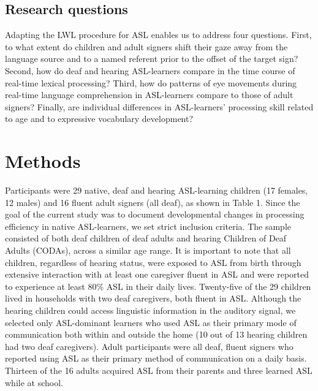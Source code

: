\documentclass[oneside]{report}
\begin{document}
\hypertarget{research-questions}{%
\subsection{Research questions}\label{research-questions}}

Adapting the LWL procedure for ASL enables us to address four questions.
First, to what extent do children and adult signers shift their gaze
away from the language source and to a named referent prior to the
offset of the target sign? Second, how do deaf and hearing ASL-learners
compare in the time course of real-time lexical processing? Third, how
do patterns of eye movements during real-time language comprehension in
ASL-learners compare to those of adult signers? Finally, are individual
differences in ASL-learners' processing skill related to age and to
expressive vocabulary development?

\hypertarget{methods}{%
\section{Methods}\label{methods}}

Participants were 29 native, deaf and hearing ASL-learning children (17
females, 12 males) and 16 fluent adult signers (all deaf), as shown in
Table 1. Since the goal of the current study was to document
developmental changes in processing efficiency in native ASL-learners,
we set strict inclusion criteria. The sample consisted of both deaf
children of deaf adults and hearing Children of Deaf Adults (CODAs),
across a similar age range. It is important to note that all children,
regardless of hearing status, were exposed to ASL from birth through
extensive interaction with at least one caregiver fluent in ASL and were
reported to experience at least 80\% ASL in their daily lives.
Twenty-five of the 29 children lived in households with two deaf
caregivers, both fluent in ASL. Although the hearing children could
access linguistic information in the auditory signal, we selected only
ASL-dominant learners who used ASL as their primary mode of
communication both within and outside the home (10 out of 13 hearing
children had two deaf caregivers). Adult participants were all deaf,
fluent signers who reported using ASL as their primary method of
communication on a daily basis. Thirteen of the 16 adults acquired ASL
from their parents and three learned ASL while at school.
\end{document}
